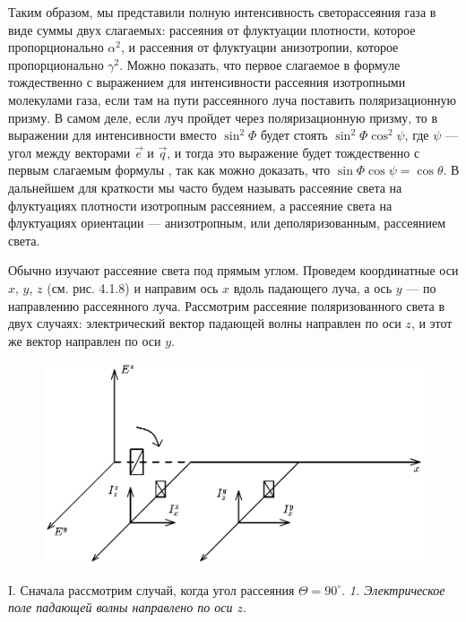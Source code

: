 Таким образом, мы представили полную интенсивность светорассеяния
газа в виде суммы двух слагаемых: рассеяния от флуктуации
плотности, которое пропорционально $\alpha^2$, и рассеяния от
флуктуации анизотропии, которое пропорционально $\gamma^2$. Можно
показать, что первое слагаемое в формуле  тождественно с
выражением  для интенсивности рассеяния изотропными
молекулами газа, если там на пути рассеянного луча поставить
поляризационную призму. В самом деле, если луч пройдет через
поляризационную призму, то в выражении  для интенсивности
вместо $\sin^2\Phi$ будет стоять $\sin^2\Phi\cos^2\psi$, где
$\psi$ --- угол между векторами $\vec e$ и $\vec q$, и тогда это
выражение будет тождественно с первым слагаемым формулы ,
так как можно доказать, что $\sin\Phi\cos\psi=\cos\theta$. В
дальнейшем для краткости мы часто будем называть рассеяние света
на флуктуациях плотности изотропным рассеянием, а рассеяние света
на флуктуациях ориентации --- анизотропным, или деполяризованным,
рассеянием света.

Обычно изучают рассеяние света под прямым углом. Проведем
координатные оси $x$, $y$, $z$ (см. рис. 4.1.8) и направим ось $x$
вдоль падающего луча, а ось $y$ --- по направлению рассеянного
луча. Рассмотрим рассеяние поляризованного света в двух случаях:
электрический вектор падающей волны направлен по оси $z$, и этот
же вектор направлен по оси $y$.

\begin{figure}[tbp]
\centerline{\hbox{\includegraphics[scale=0.9]{Ris/ris_eps/ris4_1_08.eps}}}

\end{figure}


I. Сначала рассмотрим случай, когда угол рассеяния $\Theta=90^{\circ}$.
\vskip 1mm
 {\it 1. Электрическое поле падающей волны направлено по оси $z$}.
\vskip 1mm

